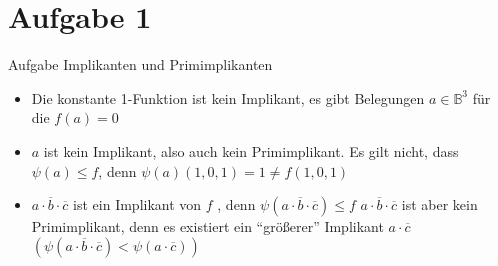 
\section{Aufgabe 1}

\setcounter{exercise}{1}

\begin{frame}[allowframebreaks]{Aufgabe \thesection}{Implikanten und Primimplikanten}
  \begin{exercisenoinc}
  \end{exercisenoinc}
  \begin{exercisenoinc}
  \end{exercisenoinc}
  \begin{solution}
      \begin{itemize}
        \item Die konstante 1-Funktion ist kein Implikant, es gibt Belegungen $a \in \mathbb{B}^3$ für die $f(a)=0$
      \end{itemize}
    \end{solution}
    \begin{solution}
      \begin{itemize}
        \item $a$ ist kein Implikant, also auch kein Primimplikant. Es gilt nicht, dass $\psi(a)\leq f$, denn $\psi(a) (1,0,1)=1\neq f(1,0,1)$
      \end{itemize}
  \end{solution}
  \begin{solution}
      \begin{itemize}
          \item $a\cdot \overline{b}\cdot \overline{c}$ ist ein Implikant von $f$ , denn $\psi(a\cdot \overline{b}\cdot \overline{c}) \leq f$
          $a\cdot \overline{b}\cdot \overline{c}$ ist aber kein Primimplikant, denn es existiert ein \enquote{größerer} Implikant $a\cdot \overline{c}$ $(\psi(a\cdot \overline{b}\cdot \overline{c}) < \psi(a\cdot \overline{c}))$

\end{itemize}
\end{solution}
\end{frame}
